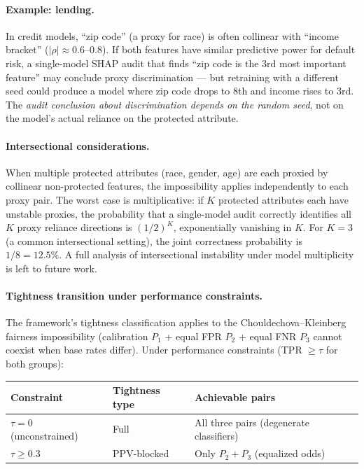 \documentclass{article}
\begin{document}
\paragraph{Example: lending.}
In credit models, ``zip code'' (a proxy for race) is often collinear
with ``income bracket'' ($|\rho| \approx 0.6$--$0.8$). If both
features have similar predictive power for default risk, a
single-model SHAP audit that finds ``zip code is the 3rd most
important feature'' may conclude proxy discrimination --- but
retraining with a different seed could produce a model where
zip code drops to 8th and income rises to 3rd. The \emph{audit
conclusion about discrimination depends on the random seed},
not on the model's actual reliance on the protected attribute.

\paragraph{Intersectional considerations.}
When multiple protected attributes (race, gender, age) are each proxied
by collinear non-protected features, the impossibility applies
independently to each proxy pair. The worst case is multiplicative: if
$K$ protected attributes each have unstable proxies, the probability
that a single-model audit correctly identifies all $K$ proxy reliance
directions is $(1/2)^K$, exponentially vanishing in $K$. For $K = 3$
(a common intersectional setting), the joint correctness probability is
$1/8 = 12.5\%$. A full analysis of intersectional instability under
model multiplicity is left to future work.

\paragraph{Tightness transition under performance constraints.}
The framework's tightness classification applies to the Chouldechova--Kleinberg fairness impossibility (calibration $P_1$ + equal FPR $P_2$ + equal FNR $P_3$ cannot coexist when base rates differ). Under performance constraints (TPR $\geq \tau$ for both groups):

\begin{center}
\small
\begin{tabular}{@{}lll@{}}
\toprule
\textbf{Constraint} & \textbf{Tightness type} & \textbf{Achievable pairs} \\
\midrule
$\tau = 0$ (unconstrained) & Full & All three pairs (degenerate classifiers) \\
$\tau \geq 0.3$ & PPV-blocked & Only $P_2{+}P_3$ (equalized odds) \\
\bottomrule
\end{tabular}
\end{center}
\end{document}
